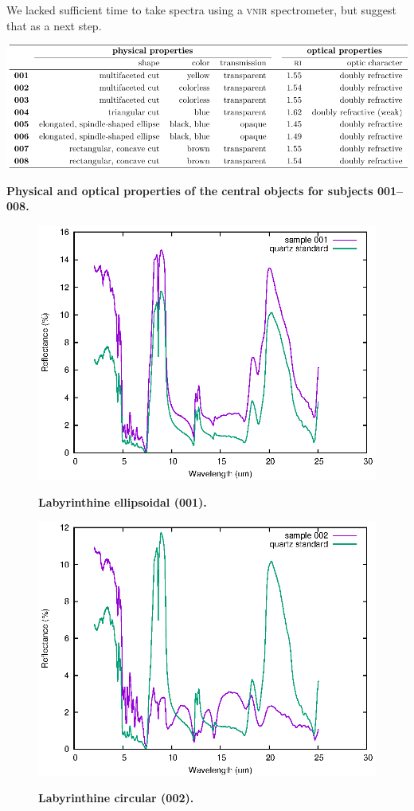 \documentclass[10pt,twoside,openany]{article}
\theoremstyle{definition}
\begin{document}
We lacked sufficient time to take spectra using a \textsc{vnir} spectrometer, but suggest that as a next step.

\begin{table}[h]
\includegraphics[width=1.0\textwidth]{gem_properties_table.pdf}
\caption{\label{tab:gem_properties}\textbf{Physical and optical properties of the central objects for subjects 001--008.}}
\end{table}

\begin{figure}
  {\includegraphics[angle=0,width=1.0\textwidth]{001.eps}}%
  {\caption{\label{fig:001}\textbf{Labyrinthine ellipsoidal (001).}}}\end{figure}
  \begin{figure}
  {\includegraphics[angle=0,width=1.0\textwidth]{002.eps}}%
  {\caption{\label{fig:002}\textbf{Labyrinthine circular (002).}}}\end{figure}
\end{document}
